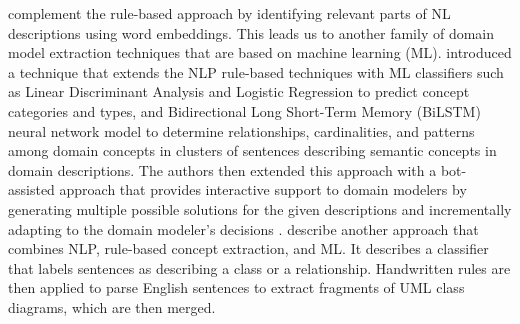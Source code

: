 \citet{Burgueno2021} complement the rule-based approach by identifying relevant parts of NL descriptions using word embeddings.
This leads us to another family of domain model extraction techniques that are based on machine learning (ML).
\citet{Saini2020,Saini2020a,Saini2020b} introduced a technique that extends the NLP rule-based techniques with ML classifiers such as Linear Discriminant Analysis and Logistic Regression to predict concept categories and types, and Bidirectional Long Short-Term Memory (BiLSTM) neural network model to determine relationships, cardinalities, and patterns among domain concepts in clusters of sentences describing semantic concepts in domain descriptions.
The authors then extended this approach with a bot-assisted approach that provides interactive support to domain modelers by generating multiple possible solutions for the given descriptions and incrementally adapting to the domain modeler's decisions \cite{Saini2022}.
\citet{Yang2022} describe another approach that combines NLP, rule-based concept extraction, and ML. It describes a classifier that labels sentences as describing a class or a relationship. Handwritten rules are then applied to parse English sentences to extract fragments of UML class diagrams, which are then merged.

